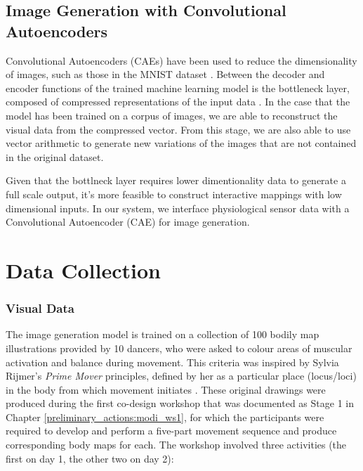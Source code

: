 \subsection*{Image Generation with Convolutional Autoencoders}

Convolutional Autoencoders (CAEs) have been used to reduce the dimensionality of images, such as those in the MNIST dataset \cite{wang_auto-encoder_2016}. Between the decoder and encoder functions of the trained machine learning model is the bottleneck layer, composed of compressed representations of the input data \cite{zhang_better_nodate}. In the case that the model has been trained on a corpus of images, we are able to reconstruct the visual data from the compressed vector. From this stage, we are also able to use vector arithmetic to generate new variations of the images that are not contained in the original dataset.

Given that the bottlneck layer requires lower dimentionality data to generate a full scale output, it's more feasible to construct interactive mappings with low dimensional inputs. In our system, we interface physiological sensor data with a Convolutional Autoencoder (CAE) for image generation.

\section{Data Collection}

\subsubsection*{Visual Data}

The image generation model is trained on a collection of 100 bodily map illustrations provided by 10 dancers, who were asked to colour areas of muscular activation and balance during movement. This criteria was inspired by Sylvia Rijmer's \textit{Prime Mover} principles, defined by her as a particular place (locus/loci) in the body from which movement initiates \cite{jurgens_designing_2020, rijmer_negotiating_2022}. These original drawings were produced during the first co-design workshop that was documented as Stage 1 in Chapter \ref{preliminary_actions:modi_ws1}, for which the participants were required to develop and perform a five-part movement sequence and produce corresponding body maps for each. The workshop involved three activities (the first on day 1, the other two on day 2):

